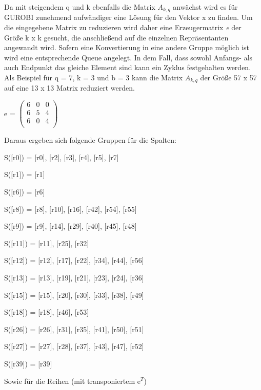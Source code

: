 \documentclass[12pt, titlepage]{article}
\begin{document}
Da mit steigendem q und k ebenfalls die Matrix $A_{k,q}$ anwächst wird es für GUROBI zunehmend aufwändiger eine Lösung für den Vektor x zu finden.
Um die eingegebene Matrix zu reduzieren wird daher eine Erzeugermatrix \textit{e} der Größe k x k gesucht, die anschließend auf die einzelnen Repräsentanten angewandt wird.
Sofern eine Konvertierung in eine andere Gruppe möglich ist wird eine entsprechende Queue angelegt.
In dem Fall, dass sowohl Anfangs- als auch Endpunkt das gleiche Element sind kann ein Zyklus festgehalten werden.
Als Beispiel für q = 7, k = 3 und b = 3 kann die Matrix $A_{k,q}$ der Größe 57 x 57 auf eine 13 x 13 Matrix reduziert werden.
\begin{center}
\item
e = 	
$
\begin{pmatrix}
	6 & 0 & 0 \\
	6 & 5 & 4 \\
	6 & 0 & 4 \\
\end{pmatrix}
$
\end{center}



\newpage
Daraus ergeben sich folgende Gruppen für die Spalten:

\begin{description}
\item S([r0]) = {[r0], [r2], [r3], [r4], [r5], [r7]}
\item S([r1]) = {[r1]}
\item S([r6]) = {[r6]}
\item S([r8]) = {[r8], [r10], [r16], [r42], [r54], [r55]}
\item S([r9]) = {[r9], [r14], [r29], [r40], [r45], [r48]}
\item S([r11]) = {[r11], [r25], [r32]}
\item S([r12]) = {[r12], [r17], [r22], [r34], [r44], [r56]}
\item S([r13]) = {[r13], [r19], [r21], [r23], [r24], [r36]}
\item S([r15]) = {[r15], [r20], [r30], [r33], [r38], [r49]}
\item S([r18]) = {[r18], [r46], [r53]}
\item S([r26]) = {[r26], [r31], [r35], [r41], [r50], [r51]}
\item S([r27]) = {[r27], [r28], [r37], [r43], [r47], [r52]}
\item S([r39]) = {[r39]}
\end{description}

Sowie für die Reihen (mit transponiertem e$^T$)
\end{document}
